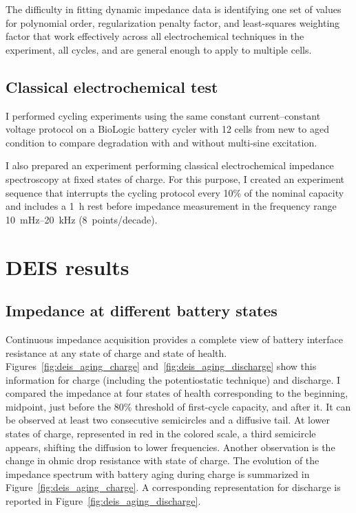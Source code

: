
The difficulty in fitting dynamic impedance data is identifying one set of values for polynomial order, regularization penalty factor, and least-squares weighting factor that work effectively across all electrochemical techniques in the experiment, all cycles, and are general enough to apply to multiple cells.

\subsection{Classical electrochemical test}
I performed cycling experiments using the same constant current--constant voltage protocol on a BioLogic battery cycler with 12 cells from new to aged condition to compare degradation with and without multi-sine excitation.

I also prepared an experiment performing classical electrochemical impedance spectroscopy at fixed states of charge. For this purpose, I created an experiment sequence that interrupts the cycling protocol every 10\% of the nominal capacity and includes a 1~h rest before impedance measurement in the frequency range 10~mHz--20~kHz (8~points/decade).


\section{DEIS results}




\subsection{Impedance at different battery states}

Continuous impedance acquisition provides a complete view of battery interface resistance at any state of charge and state of health. Figures~\ref{fig:deis_aging_charge} and~\ref{fig:deis_aging_discharge} show this information for charge (including the potentiostatic technique) and discharge. I compared the impedance at four states of health corresponding to the beginning, midpoint, just before the 80\% threshold of first-cycle capacity, and after it. 
It can be observed at least two consecutive semicircles and a diffusive tail. At lower states of charge, represented in red in the colored scale, a third semicircle appears, shifting the diffusion to lower frequencies.
Another observation is the change in ohmic drop resistance with state of charge.
The evolution of the impedance spectrum with battery aging during charge is summarized in Figure~\ref{fig:deis_aging_charge}. 
A corresponding representation for discharge is reported in Figure~\ref{fig:deis_aging_discharge}.

